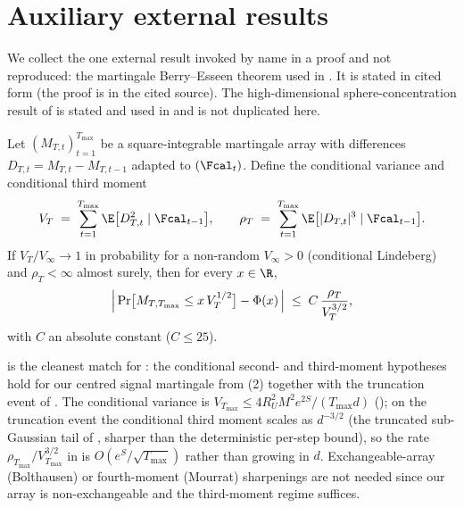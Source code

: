 \section{Auxiliary external results}
\label{sec:auxiliary}

We collect the one external result invoked by name in a proof and not
reproduced: the martingale Berry--Esseen theorem used in
. It is stated in cited form (the proof is in the cited
source). The high-dimensional sphere-concentration result of
 is stated and used in
 and is not duplicated here.

\begin{theorem}
\label{thm:hallheyde_be}
Let $(M_{T,t})_{t=1}^{T_{\max}}$ be a square-integrable martingale array
with differences $D_{T,t}=M_{T,t}-M_{T,t-1}$ adapted to $(\Fcal_t)$.
Define the conditional variance and conditional third moment
\begin{align}\label{eq:hallheyde_moments}
   V_T \;=\; \sum_{t=1}^{T_{\max}} \E\bigl[D_{T,t}^2 \mid \Fcal_{t-1}\bigr],
   \qquad
   \rho_T \;=\; \sum_{t=1}^{T_{\max}} \E\bigl[|D_{T,t}|^3 \mid \Fcal_{t-1}\bigr].
\end{align}
If $V_T/V_\infty\to1$ in probability for a non-random $V_\infty>0$
(conditional Lindeberg) and $\rho_T<\infty$ almost surely, then for every
$x\in\R$,
\begin{align}\label{eq:hallheyde_rate}
   \Bigl|\, \Pr\bigl[M_{T,T_{\max}} \le x\,V_T^{1/2}\bigr] - \Phi(x) \,\Bigr|
   \;\le\;
   C\,\frac{\rho_T}{V_T^{3/2}},
\end{align}
with $C$ an absolute constant ($C\le25$).
\end{theorem}

\begin{remark}
\label{rem:hallheyde_choice}
 is the cleanest match for : the
conditional second- and third-moment hypotheses hold for our centred
signal martingale from (2) together with
the truncation event of . The conditional
variance is $V_{T_{\max}}\le4R_U^2M^2e^{2S}/(T_{\max}d)$
(); on the truncation event the conditional third
moment scales as $d^{-3/2}$ (the truncated sub-Gaussian tail of
, sharper than the deterministic per-step bound),
so the rate $\rho_{T_{\max}}/V_{T_{\max}}^{3/2}$ in
 is $O(e^S/\sqrt{T_{\max}})$ rather than growing
in $d$. Exchangeable-array (Bolthausen) or fourth-moment (Mourrat)
sharpenings are not needed since our array is non-exchangeable and the
third-moment regime suffices.
\end{remark}
